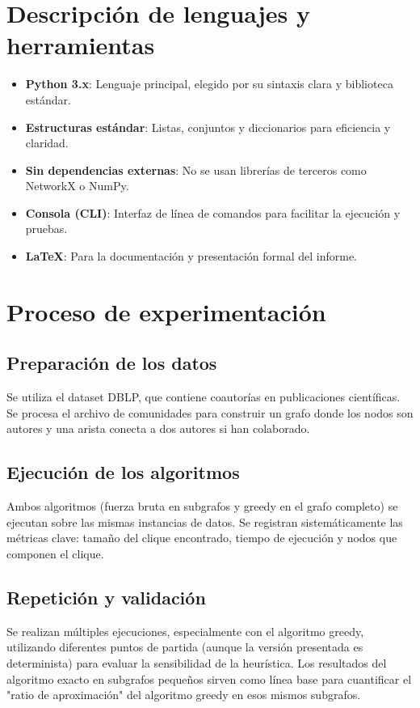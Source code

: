 \documentclass[12pt,a4paper]{report}
\begin{document}
\section{Descripción de lenguajes y herramientas}
\begin{itemize}
    \item \textbf{Python 3.x}: Lenguaje principal, elegido por su sintaxis clara y biblioteca estándar.
    \item \textbf{Estructuras estándar}: Listas, conjuntos y diccionarios para eficiencia y claridad.
    \item \textbf{Sin dependencias externas}: No se usan librerías de terceros como NetworkX o NumPy.
    \item \textbf{Consola (CLI)}: Interfaz de línea de comandos para facilitar la ejecución y pruebas.
    \item \textbf{LaTeX}: Para la documentación y presentación formal del informe.
\end{itemize}

\section{Proceso de experimentación}
\subsection{Preparación de los datos}
Se utiliza el dataset DBLP, que contiene coautorías en publicaciones científicas. Se procesa el archivo de comunidades para construir un grafo donde los nodos son autores y una arista conecta a dos autores si han colaborado.

\subsection{Ejecución de los algoritmos}
Ambos algoritmos (fuerza bruta en subgrafos y greedy en el grafo completo) se ejecutan sobre las mismas instancias de datos. Se registran sistemáticamente las métricas clave: tamaño del clique encontrado, tiempo de ejecución y nodos que componen el clique.

\subsection{Repetición y validación}
Se realizan múltiples ejecuciones, especialmente con el algoritmo greedy, utilizando diferentes puntos de partida (aunque la versión presentada es determinista) para evaluar la sensibilidad de la heurística. Los resultados del algoritmo exacto en subgrafos pequeños sirven como línea base para cuantificar el "ratio de aproximación" del algoritmo greedy en esos mismos subgrafos.
\end{document}

